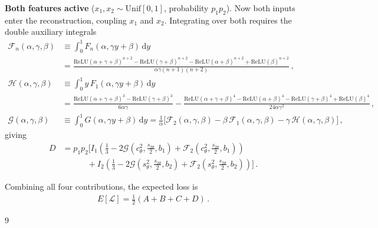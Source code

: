 \documentclass[a4paper]{article}
\begin{document}
\newpage
\textbf{Both features active} ($x_1,x_2\sim\mathrm{Unif}[0,1]$, probability $p_1 p_2$). Now both inputs enter the reconstruction, coupling $x_1$ and $x_2$. Integrating over both requires the double auxiliary integrals
\begin{align}
\mathcal{F}_n(\alpha,\gamma,\beta) &\equiv \int_0^1 F_n(\alpha,\gamma y+\beta)\,\mathrm{d}y \nonumber\\
&= \frac{\mathrm{ReLU}(\alpha+\gamma+\beta)^{n+2}-\mathrm{ReLU}(\gamma+\beta)^{n+2}-\mathrm{ReLU}(\alpha+\beta)^{n+2}+\mathrm{ReLU}(\beta)^{n+2}}{\alpha\gamma(n+1)(n+2)}\,, \\[8pt]
\mathcal{H}(\alpha,\gamma,\beta) &\equiv \int_0^1 y\,F_1(\alpha,\gamma y+\beta)\,\mathrm{d}y \nonumber\\
&= \frac{\mathrm{ReLU}(\alpha+\gamma+\beta)^3-\mathrm{ReLU}(\gamma+\beta)^3}{6\alpha\gamma}
- \frac{\mathrm{ReLU}(\alpha+\gamma+\beta)^4-\mathrm{ReLU}(\alpha+\beta)^4-\mathrm{ReLU}(\gamma+\beta)^4+\mathrm{ReLU}(\beta)^4}{24\alpha\gamma^2}\,, \\[8pt]
\mathcal{G}(\alpha,\gamma,\beta) &\equiv \int_0^1 G(\alpha,\gamma y+\beta)\,\mathrm{d}y
= \frac{1}{\alpha}\Big[\mathcal{F}_2(\alpha,\gamma,\beta) - \beta\,\mathcal{F}_1(\alpha,\gamma,\beta) - \gamma\,\mathcal{H}(\alpha,\gamma,\beta)\Big]\,,
\end{align}
giving
\begin{align}
D &= p_1 p_2\bigg[I_1\!\left(\tfrac{1}{3}-2\mathcal{G}\!\left(c^2_\theta,\tfrac{s_{2\theta}}{2},b_1\right)+\mathcal{F}_2\!\left(c^2_\theta,\tfrac{s_{2\theta}}{2},b_1\right)\right) \nonumber\\
&\qquad\quad + I_2\!\left(\tfrac{1}{3}-2\mathcal{G}\!\left(s^2_\theta,\tfrac{s_{2\theta}}{2},b_2\right)+\mathcal{F}_2\!\left(s^2_\theta,\tfrac{s_{2\theta}}{2},b_2\right)\right)\bigg]\,.
\end{align}

Combining all four contributions, the expected loss is
\begin{align}
\boxed{E[\mathcal{L}] = \frac{1}{2}(A+B+C+D)\,.}
\end{align}

\begin{thebibliography}{9}
\end{thebibliography}
\end{document}
